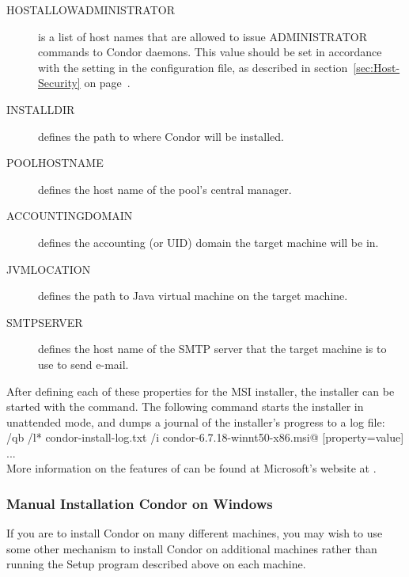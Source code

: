 \begin{description}
\item[HOSTALLOWADMINISTRATOR]
is a list of host names that are allowed to issue ADMINISTRATOR commands to
Condor daemons. This value should be set in accordance with the
 setting in the configuration file, 
as described in
section~\ref{sec:Host-Security} on page~\pageref{sec:Host-Security}.

\item[INSTALLDIR]
defines the path to where Condor will be installed. 

\item[POOLHOSTNAME]
defines the host name of the pool's central manager. 

\item[ACCOUNTINGDOMAIN] 
defines the accounting (or UID) domain the target machine will be in.

\item[JVMLOCATION]
defines the path to Java virtual machine on the target machine.

\item[SMTPSERVER]
defines the host name of the SMTP server that the target machine is to
use to send e-mail.
\end{description}

After defining each of these properties for the MSI installer, the
installer can be started with the \verb@msiexec@ command. The following
command starts the installer in unattended mode, and dumps a journal of
the installer's progress to a log file:\\
\verb@msiexec /qb /l* condor-install-log.txt /i condor-6.7.18-winnt50-x86.msi@ [property=value] ... \\

More information on the features of \verb@msiexec@
can be found at Microsoft's website at
.

\subsubsection{\label{sec:NT-Manual-Install}Manual Installation Condor on Windows}

If you are to install Condor on many different machines, you may wish
to use some other mechanism to install Condor on additional machines
rather than running the Setup program described above on each machine.

